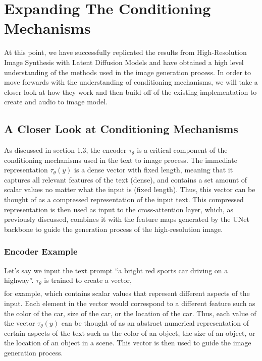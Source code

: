 \documentclass{article}
\begin{document}
\clearpage\section{Expanding The Conditioning Mechanisms}

At this point, we have successfully replicated the results from High-Resolution Image Synthesis with Latent Diffusion Models and have obtained a high level understanding of the methods used in the image generation process. In order to move forwards with the understanding of conditioning mechanisms, we will take a closer look at how they work and then build off of the existing implementation to create and audio to image model.
\subsection{A Closer Look at Conditioning Mechanisms}

As discussed in section 1.3, the encoder $\tau_{\theta}$ is a critical component of the conditioning mechanisms used in the text to image process. The immediate representation $\tau_{\theta}(y)$ is a dense vector with fixed length, meaning that it captures all relevant features of the text (dense), and contains a set amount of scalar values no matter what the input is (fixed length). Thus, this vector can be thought of as a compressed representation of the input text. This compressed representation is then used as input to the cross-attention layer, which, as previously discussed, combines it with the feature maps generated by the UNet backbone to guide the generation process of the high-resolution image. 

\subsubsection{Encoder Example}

Let's say we input the text prompt “a bright red sports car driving on a highway”. $\tau_{\theta}$ is trained to create a vector, 
\begin{align*}
    [0.21, -0.14, 0.87, 0.76, -0.92, 0.33, 0.45, 0.19, -0.66, -0.58]
\end{align*} for example, which contains scalar values that represent different aspects of the input. Each element in the vector would correspond to a different feature such as the color of the car, size of the car, or the location of the car. Thus, each value of the vector $\tau_{\theta}(y)$ can be thought of as an abstract numerical representation of certain aspects of the text  such as the color of an object, the size of an object, or the location of an object in a scene. This vector is then used to guide the image generation process. 
\end{document}
